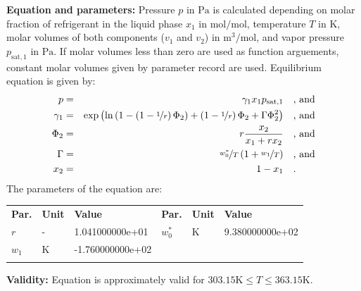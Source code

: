 \textbf{Equation and parameters:}
\newline
%
Pressure $p$ in $\si{\pascal}$ is calculated depending on molar fraction of refrigerant in the liquid phase $x_1$ in $\si{\mole\per\mole}$, temperature $T$ in $\si{\kelvin}$, molar volumes of both components ($v_1$ and $v_2$) in $\si{\cubic\meter\per\mole}$, and vapor pressure $p_\mathrm{sat,1}$ in $\si{\pascal}$. If molar volumes less than zero are used as function arguements, constant molar volumes given by parameter record are used. Equilibrium equation is given by:
%
\begin{equation*}
\begin{split}
p &=& \gamma_1 x_1 p_\mathrm{sat,1} & \quad\text{, and} \\
\gamma_1 &=& \exp \left( \ln \left( 1 - \left( 1 - \nicefrac{1}{r} \right) \Phi_2  \right) + \left(1 - \nicefrac{1}{r}\right) \Phi_2 + \Gamma \Phi_2 ^2 \right) & \quad\text{, and} \\
\Phi_2 &=& r \frac{x_2}{x_1 + r x_2} & \quad\text{, and} \\
\Gamma &=& \nicefrac{w_0^{*}}{T} \left( 1 + \nicefrac{w_1}{T} \right) & \quad\text{, and} \\
x_2 &=& 1 - x_1  & \quad\text{.} \\
\end{split}
\end{equation*}
%
The parameters of the equation are:
%
\begin{longtable}[l]{lll|lll}
\toprule
\addlinespace
\textbf{Par.} & \textbf{Unit} & \textbf{Value} &	\textbf{Par.} & \textbf{Unit} & \textbf{Value} \\
\addlinespace
\midrule
\endhead

\bottomrule
\endfoot
\bottomrule
\endlastfoot
\addlinespace

$r$ & - & 1.041000000e+01 & $w_0^{*}$ & $\si{\kelvin}$ & 9.380000000e+02 \\
$w_1$ & $\si{\kelvin}$ & -1.760000000e+02 & & & \\

\addlinespace\end{longtable}

\textbf{Validity:}
\newline
Equation is approximately valid for $303.15 \si{\kelvin} \leq T \leq 363.15 \si{\kelvin}$.
\newline

